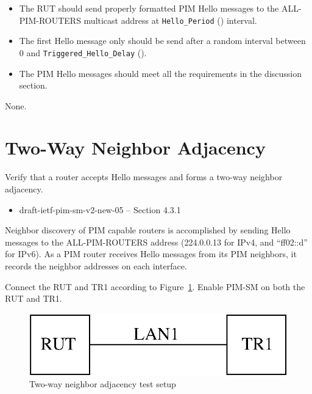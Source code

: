 \documentclass[11pt]{report}
\begin{document}
\begin{itemize}

  \item The RUT should send properly formatted PIM Hello messages to the
        ALL-PIM-ROUTERS multicast address at \verb=Hello_Period=
        ({\PimsmHelloPeriod}) interval.

  \item The first Hello message only should be send after a random
        interval between 0 and \verb=Triggered_Hello_Delay=
        ({\PimsmTriggeredHelloDelay}).

  \item The PIM Hello messages should meet all the requirements in the
        discussion section.

\end{itemize}

None.

\newpage
\section{Two-Way Neighbor Adjacency}

Verify that a router accepts Hello messages and forms a two-way neighbor
adjacency.

\begin{itemize}
  \item draft-ietf-pim-sm-v2-new-05 -- Section 4.3.1
\end{itemize}

Neighbor discovery of PIM capable routers is accomplished by sending Hello
messages to the ALL-PIM-ROUTERS address (224.0.0.13 for IPv4,
and ``ff02::d'' for IPv6). As a PIM router receives Hello messages from its
PIM neighbors, it records the neighbor addresses on each interface.

Connect the RUT and TR1 according to
Figure~\ref{fig:pim_test_2_2_two_way_neighbor_adjacency}.
Enable PIM-SM on both the RUT and TR1.

\begin{figure}[htbp]
  \begin{center}
    \includegraphics[scale=0.8]{figs/pim_test_2_2_two_way_neighbor_adjacency}
    \caption{Two-way neighbor adjacency test setup}
    \label{fig:pim_test_2_2_two_way_neighbor_adjacency}
  \end{center}
\end{figure}
\end{document}
